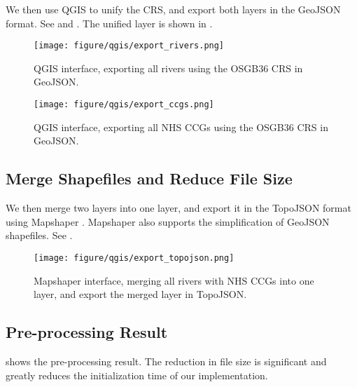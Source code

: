 We then use QGIS to unify the CRS, and export both layers in the GeoJSON format. See  and . The unified layer is shown in .

{
    \begin{figure}[tbh!]
        \centering
        \texttt{[image: figure/qgis/export\_rivers.png]}
        \caption{QGIS interface, exporting all rivers using the OSGB36 CRS in GeoJSON.}
        \label{fig:export_rivers}
    \end{figure}

    \begin{figure}[tbh!]
        \centering
        \texttt{[image: figure/qgis/export\_ccgs.png]}
        \caption{QGIS interface, exporting all NHS CCGs using the OSGB36 CRS in GeoJSON.}
        \label{fig:export_ccgs}
    \end{figure}

}

\subsection{Merge Shapefiles and Reduce File Size}

We then merge two layers into one layer, and export it in the TopoJSON format using Mapshaper \cite{blochMapshaper}. Mapshaper also supports the simplification of GeoJSON shapefiles. See .

{
    \begin{figure}[tbh!]
        \centering
        \texttt{[image: figure/qgis/export\_topojson.png]}
        \caption{Mapshaper interface, merging all rivers with NHS CCGs into one layer, and export the merged layer in TopoJSON.}
        \label{fig:export_topojson}
    \end{figure}
}

\subsection{Pre-processing Result}

 shows the pre-processing result. The reduction in file size is significant and greatly reduces the initialization time of our implementation.

